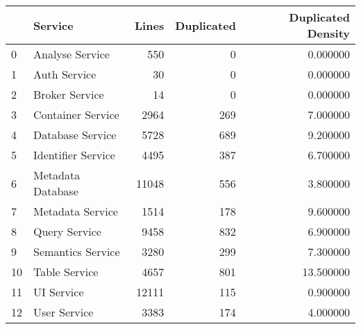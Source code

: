 \begin{tabular}{llrrr}
\toprule
 & Service & Lines & Duplicated & Duplicated Density \\
\midrule
0 & Analyse Service & 550 & 0 & 0.000000 \\
1 & Auth Service & 30 & 0 & 0.000000 \\
2 & Broker Service & 14 & 0 & 0.000000 \\
3 & Container Service & 2964 & 269 & 7.000000 \\
4 & Database Service & 5728 & 689 & 9.200000 \\
5 & Identifier Service & 4495 & 387 & 6.700000 \\
6 & Metadata Database & 11048 & 556 & 3.800000 \\
7 & Metadata Service & 1514 & 178 & 9.600000 \\
8 & Query Service & 9458 & 832 & 6.900000 \\
9 & Semantics Service & 3280 & 299 & 7.300000 \\
10 & Table Service & 4657 & 801 & 13.500000 \\
11 & UI Service & 12111 & 115 & 0.900000 \\
12 & User Service & 3383 & 174 & 4.000000 \\
\bottomrule
\end{tabular}
